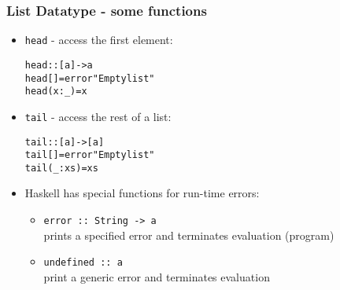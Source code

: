 \documentclass[final,handout]{beamer}
\begin{document}
\begin{frame}[fragile]
    \frametitle{List Datatype \text{[a]} - some functions}

    \begin{itemize}
        \item \texttt{head} - access the first element:
    \begin{alltt}
    head :: [a] -> a 
    head []      = error "Empty list"
    head (x : _) = x
    \end{alltt}

        \item \texttt{tail} - access the rest of a list:
    \begin{alltt}
    tail :: [a] -> [a]
    tail []       = error "Empty list" 
    tail (_ : xs) = xs
    \end{alltt}

    \item Haskell has special functions for run-time errors:

        \begin{itemize}
            \item \texttt{error :: String -> a} \\prints a specified error and
                terminates evaluation (program)
            \item \texttt{undefined :: a} \\ print a generic error and terminates
                evaluation
        \end{itemize}

    \end{itemize}

\end{frame}
\end{document}
